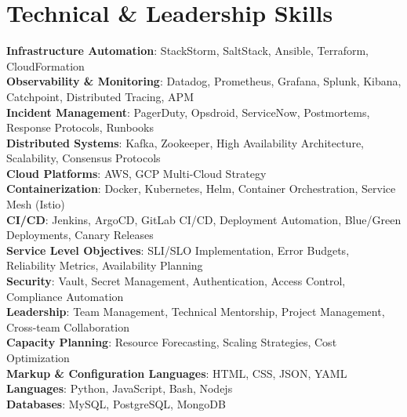 \documentclass[letterpaper,11pt]{article}
\begin{document}
\section{Technical \& Leadership Skills}
 \begin{itemize}[leftmargin=0.15in, label={}]
    \small{\item{
      \textbf{Infrastructure Automation}{: StackStorm, SaltStack, Ansible, Terraform, CloudFormation} \\
      \textbf{Observability \& Monitoring}{: Datadog, Prometheus, Grafana, Splunk, Kibana, Catchpoint, Distributed Tracing, APM} \\
      \textbf{Incident Management}{: PagerDuty, Opsdroid, ServiceNow, Postmortems, Response Protocols, Runbooks} \\
      \textbf{Distributed Systems}{: Kafka, Zookeeper, High Availability Architecture, Scalability, Consensus Protocols} \\
      \textbf{Cloud Platforms}{: AWS, GCP Multi-Cloud Strategy} \\
      \textbf{Containerization}{: Docker, Kubernetes, Helm, Container Orchestration, Service Mesh (Istio)} \\
      \textbf{CI/CD}{: Jenkins, ArgoCD, GitLab CI/CD, Deployment Automation, Blue/Green Deployments, Canary Releases} \\
      \textbf{Service Level Objectives}{: SLI/SLO Implementation, Error Budgets, Reliability Metrics, Availability Planning} \\
      \textbf{Security}{: Vault, Secret Management, Authentication, Access Control, Compliance Automation} \\
      \textbf{Leadership}{: Team Management, Technical Mentorship, Project Management, Cross-team Collaboration} \\
      \textbf{Capacity Planning}{: Resource Forecasting, Scaling Strategies, Cost Optimization} \\
      \textbf{Markup \& Configuration Languages}{: HTML, CSS, JSON, YAML} \\
      \textbf{Languages}{: Python, JavaScript, Bash, Nodejs} \\
      \textbf{Databases}{: MySQL, PostgreSQL, MongoDB} \\
    }}
 \end{itemize}


\end{document}
